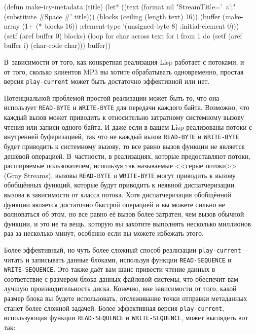 \begin{myverb}
(defun make-icy-metadata (title)
  (let* ((text (format nil "StreamTitle='~a';" (substitute #\bslash{}Space #\bslash{}' title)))
         (blocks (ceiling (length text) 16))
         (buffer (make-array (1+ (* blocks 16))
                             :element-type '(unsigned-byte 8)
                             :initial-element 0)))
    (setf (aref buffer 0) blocks)
    (loop 
       for char across text
       for i from 1 
       do (setf (aref buffer i) (char-code char)))
    buffer))
\end{myverb}

В~зависимости от того, как конкретная реализация Lisp работает с потоками, и от того,
сколько клиентов MP3 вы хотите обрабатывать одновременно, простая версия
\lstinline{play-current} может быть достаточно эффективной или нет.

Потенциальной проблемой простой реализации может быть то, что она использует
\lstinline{READ-BYTE} и \lstinline{WRITE-BYTE} для передачи каждого байта. Возможно, что каждый
вызов может приводить к относительно затратному системному вызову чтения или записи одного
байта.  И даже если в вашем Lisp реализованы потоки с внутренней буферизацией, так что не
каждый вызов \lstinline{READ-BYTE} и \lstinline{WRITE-BYTE} будет приводить к системному вызову, то
все равно вызов функции не является дешёвой операцией.  В~частности, в реализациях,
которые предоставляют потоки, расширяемые пользователем, используя так называемые <<серые
потоки>> (Gray Streams), вызовы \lstinline{READ-BYTE} и \lstinline{WRITE-BYTE} могут приводить к
вызову обобщённых функций, которые будут приводить к неявной диспатчеризации вызова в
зависимости от класса потока.  Хотя диспатчеризация обобщённой функции является достаточно
быстрой операцией и вы можете сильно не волноваться об этом, но все равно её вызов более
затратен, чем вызов обычной функции, и это не та вещь, которую вы захотите выполнять
несколько миллионов раз за несколько минут, особенно если вы можете избежать этого.

Более эффективный, но чуть более сложный способ реализации \lstinline{play-current}~-- читать и
записывать данные блоками, используя функции \lstinline{READ-SEQUENCE} и \lstinline{WRITE-SEQUENCE}.
Это также даёт вам шанс привести чтение данных в соответствие с размером блока данных
файловой системы, что обеспечит вам лучшую производительность диска.  Конечно, вне
зависимости от того, какой размер блока вы будете использовать, отслеживание точки
отправки метаданных станет более сложной задачей.  Более эффективная версия
\lstinline{play-current}, использующая функции \lstinline{READ-SEQUENCE} и \lstinline{WRITE-SEQUENCE},
может выглядеть вот так:

